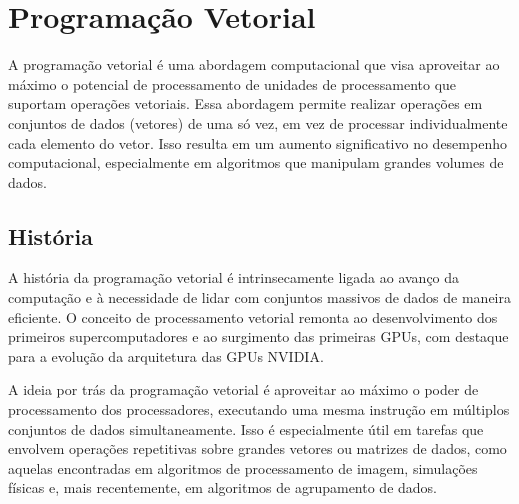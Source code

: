 \documentclass[12pt,
openright, 
oneside, %
a4paper,    %
brazil]{facom-ufu-abntex2}
\begin{document}

\section{Programação Vetorial}




A programação vetorial é uma abordagem computacional que visa aproveitar ao máximo o potencial de processamento de unidades de processamento que suportam operações vetoriais. Essa abordagem permite realizar operações em conjuntos de dados (vetores) de uma só vez, em vez de processar individualmente cada elemento do vetor. Isso resulta em um aumento significativo no desempenho computacional, especialmente em algoritmos que manipulam grandes volumes de dados.



\subsection{História}

A história da programação vetorial é intrinsecamente ligada ao avanço da computação e à necessidade de lidar com conjuntos massivos de dados de maneira eficiente. O conceito de processamento vetorial remonta ao desenvolvimento dos primeiros supercomputadores e ao surgimento das primeiras GPUs, com destaque para a evolução da arquitetura das GPUs NVIDIA.

A ideia por trás da programação vetorial é aproveitar ao máximo o poder de processamento dos processadores, executando uma mesma instrução em múltiplos conjuntos de dados simultaneamente. Isso é especialmente útil em tarefas que envolvem operações repetitivas sobre grandes vetores ou matrizes de dados, como aquelas encontradas em algoritmos de processamento de imagem, simulações físicas e, mais recentemente, em algoritmos de agrupamento de dados.
\end{document}
